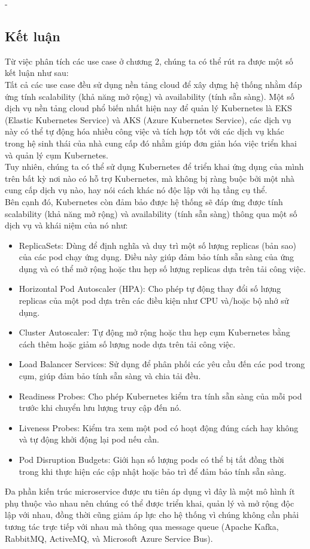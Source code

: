 \begin {list} {-}{}
\subsection{Kết luận}
Từ việc phân tích các use case ở chương 2, chúng ta có thể rút ra được một số kết luận như sau:\\[0.5cm]
\noindent Tất cả các use case đều sử dụng nền tảng cloud để xây dựng hệ thống nhằm đáp ứng tính 
scalability (khả năng mở rộng) và availability (tính sẵn sàng). Một số dịch vụ nền tảng cloud phổ biến nhất hiện nay để quản lý Kubernetes là EKS (Elastic Kubernetes Service) và AKS (Azure Kubernetes Service), các dịch vụ này có thể tự động hóa nhiều công việc và tích hợp tốt với các dịch vụ khác trong hệ sinh thái của nhà cung cấp đó nhằm giúp đơn giản hóa việc triển khai và quản lý cụm Kubernetes. \\[0.5cm]
Tuy nhiên, chúng ta có thể sử dụng Kubernetes để triển khai ứng dụng của mình trên bất kỳ nơi nào có hỗ trợ Kubernetes, mà không bị ràng buộc bởi một nhà cung cấp dịch vụ nào, hay nói cách khác nó độc lập với hạ tầng cụ thể. \\[0.5cm]
Bên cạnh đó, Kubernetes còn đảm bảo được hệ thống sẽ đáp ứng được tính scalability (khả năng mở rộng) và availability (tính sẵn sàng) thông qua một số dịch vụ và khái niệm của nó như:
\begin{itemize}
    \item ReplicaSets: Dùng để định nghĩa và duy trì một số lượng replicas (bản sao) của các pod chạy ứng dụng. Điều này giúp đảm bảo tính sẵn sàng của ứng dụng và có thể mở rộng hoặc thu hẹp số lượng replicas dựa trên tải công việc.
    \item Horizontal Pod Autoscaler (HPA): Cho phép tự động thay đổi số lượng replicas của một pod dựa trên các điều kiện như CPU và/hoặc bộ nhớ sử dụng.
    \item Cluster Autoscaler: Tự động mở rộng hoặc thu hẹp cụm Kubernetes bằng cách thêm hoặc giảm số lượng node dựa trên tải công việc.
    \item Load Balancer Services: Sử dụng để phân phối các yêu cầu đến các pod trong cụm, giúp đảm bảo tính sẵn sàng và chia tải đều.
    \item Readiness Probes: Cho phép Kubernetes kiểm tra tính sẵn sàng của mỗi pod trước khi chuyển lưu lượng truy cập đến nó.
    \item Liveness Probes: Kiểm tra xem một pod có hoạt động đúng cách hay không và tự động khởi động lại pod nếu cần.
    \item Pod Disruption Budgets: Giới hạn số lượng pods có thể bị tắt đồng thời trong khi thực hiện các cập nhật hoặc bảo trì để đảm bảo tính sẵn sàng.
\end{itemize}
\noindent Đa phần kiến trúc microservice được ưu tiên áp dụng vì đây là một mô hình ít phụ thuộc vào nhau nên chúng có thể được triển khai, quản lý và mở rộng độc lập với nhau, đồng thời cũng giảm áp lực cho hệ thống vì chúng không cần phải tương tác trực tiếp với nhau mà thông qua message queue (Apache Kafka, RabbitMQ, ActiveMQ, và Microsoft Azure Service Bus).

\end{list}
